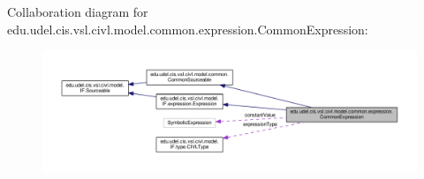 Collaboration diagram for edu.\+udel.\+cis.\+vsl.\+civl.\+model.\+common.\+expression.\+Common\+Expression\+:
\nopagebreak
\begin{figure}[H]
\begin{center}
\leavevmode
\includegraphics[width=350pt]{classedu_1_1udel_1_1cis_1_1vsl_1_1civl_1_1model_1_1common_1_1expression_1_1CommonExpression__coll__graph}
\end{center}
\end{figure}
